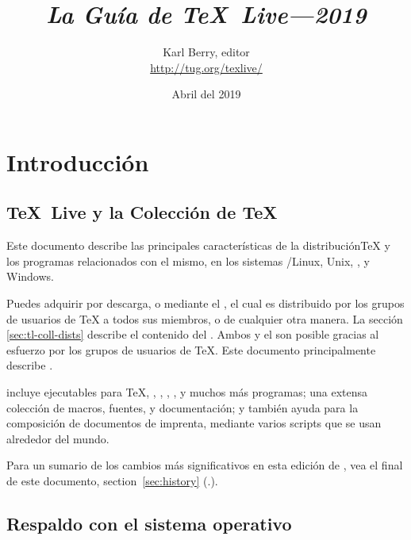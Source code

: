 \documentclass{article}
\begin{document}
\title{%
{\huge \textit{La Guía de \TeX\ Live---2019}}}

\author{Karl Berry, editor \\[3mm]
        \url{http://tug.org/texlive/}}

\date{Abril del 2019}

\maketitle

\begin{multicols}{2}
\tableofcontents
\end{multicols}

\section{Introducción}
\label{sec:intro}

\subsection{\TeX\ Live y la Colección de \TeX\ }


Este documento describe las principales características de la
distribución\Dash \TeX{} y los programas relacionados con el mismo, en
los sistemas \GNU/Linux, Unix, \MacOSX, y Windows.

Puedes adquirir \TL{} por descarga, o mediante el \TK{} \DVD, el
cual es distribuido por los grupos de usuarios de \TeX{} a todos sus
miembros, o de cualquier otra manera. La sección
\ref{sec:tl-coll-dists} describe el contenido del \DVD. Ambos \TL{} y
el \TK{} son posible gracias al esfuerzo por los grupos de usuarios de
\TeX{}. Este documento principalmente describe \TL{}.

\TL{} incluye ejecutables para \TeX{}, \LaTeXe{}, \ConTeXt, \MF, \MP,
\BibTeX{} y muchos más programas; una extensa colección de macros,
fuentes, y documentación; y también ayuda para la composición de
documentos de imprenta, mediante varios scripts que se usan alrededor
del mundo.

Para un sumario de los cambios más significativos en esta edición de
\TL{}, vea el final de este documento, section~\ref{sec:history}
(\p.\pageref{sec:history}).

\subsection{Respaldo con el sistema operativo}
\label{sec:os-support}
\end{document}
